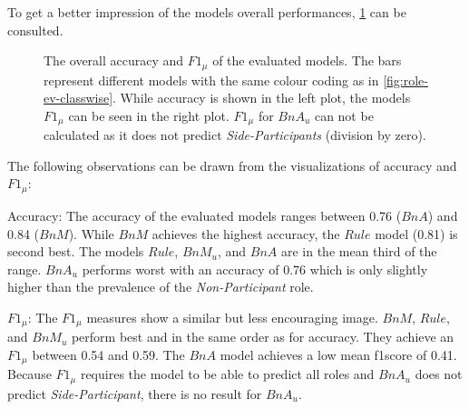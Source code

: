 To get a better impression of the models overall performances, \cref{fig:role-ev-f1acc} can be consulted.
\begin{figure}[tbh]
  \centering
  \begin{subfigure}[t]{0.54\textwidth}
    \centering
    \begin{small}
    
    \end{small}
  \end{subfigure}
  \begin{subfigure}[t]{0.45\textwidth}
    \centering
    \begin{small}
    
    \end{small}
  \end{subfigure}
  \vspace{-15pt}
    \caption[Overall performance of simple models.]{\label{fig:role-ev-f1acc} 
    The overall \gls{accuracy} and \(F1_\mu\) of the evaluated models.
    The bars represent different models with the same colour coding as in \cref{fig:role-ev-classwise}.
    While \gls{accuracy} is shown in the left plot, the models \(F1_\mu\) can be seen in the right plot.
    \(F1_\mu\) for \(BnA_u\) can not be calculated as it does not predict \emph{Side-Participants} (division by zero).
    }
\end{figure}
The following observations can be drawn from the visualizations of \gls{accuracy} and \(F1_\mu\):
\begin{description}
    \item{Accuracy:} The \gls{accuracy} of the evaluated models ranges between 0.76 (\(BnA\)) and 0.84 (\(BnM\)).
    While \(BnM\) achieves the highest \gls{accuracy}, the \(Rule\) model (0.81) is second best.
    The models \(Rule\), \(BnM_u\), and \(BnA\) are in the mean third of the range.
    \(BnA_u\) performs worst with an \gls{accuracy} of 0.76 which is only slightly higher than the \gls{prevalence} of the \emph{Non-Participant} role. 
    \item{\(F1_\mu\):} The \(F1_\mu\) measures show a similar but less encouraging image.
    \(BnM\), \(Rule\), and \(BnM_u\) perform best and in the same order as for \gls{accuracy}. 
    They achieve an \(F1_\mu\) between 0.54 and 0.59.
    The \(BnA\) model achieves a low mean \gls{f1score} of 0.41.
    Because \(F1_\mu\) requires the model to be able to predict all roles and \(BnA_u\) does not predict \emph{Side-Participant}, there is no result for \(BnA_u\).
\end{description}

